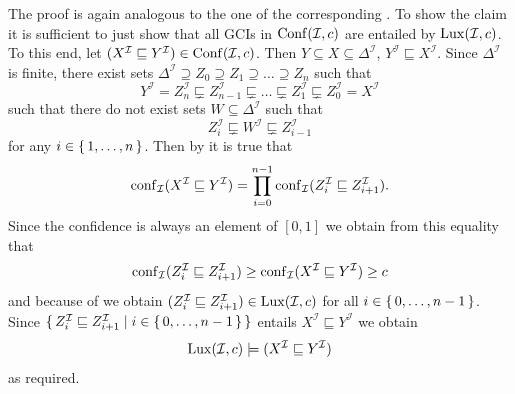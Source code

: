 \begin{Proof}
  The proof is again analogous to the one of the corresponding
  .  To show the claim it is sufficient to just show that all
  GCIs in $\operatorname{Conf}(\mathcal{I}, c)$ are entailed by $\operatorname{Lux}(\mathcal{I}, c)$.  To this end,
  let $(X^{\mathcal{I}} \sqsubseteq Y^{\mathcal{I}}) \in \operatorname{Conf}(\mathcal{I}, c)$.  Then $Y
  \subseteq X \subseteq \Delta^{\mathcal{I}}$, \ie $Y^{\mathcal{I}} \sqsubseteq
  X^{\mathcal{I}}$.  Since $\Delta^{\mathcal{I}}$ is finite, there exist sets
  $\Delta^{\mathcal{I}} \supseteq Z_0 \supseteq Z_1 \supseteq \dots \supseteq Z_n$ such
  that
  \begin{equation*}
    Y^{\mathcal{I}} = Z_n^{\mathcal{I}} \sqsubsetneq Z_{n-1}^{\mathcal{I}} \sqsubsetneq
    \dots \sqsubsetneq Z_1^{\mathcal{I}} \sqsubsetneq Z_0^{\mathcal{I}} = X^{\mathcal{I}}
  \end{equation*}
  such that there do not exist sets $W \subseteq \Delta^{\mathcal{I}}$ such that
  \begin{equation}
    \label{eq:25}
    Z_i^{\mathcal{I}} \sqsubsetneq W^{\mathcal{I}} \sqsubsetneq Z_{i-1}^{\mathcal{I}}
  \end{equation}
  for any $i \in {\ensuremath{\{\, 1, \dots, n \,\}}}$.  Then by
   it is true that
  \begin{equation*}
    \operatorname{conf}_{\mathcal{I}}(X^{\mathcal{I}} \sqsubseteq Y^{\mathcal{I}}) = \prod_{i = 0}^{n-1}
    \operatorname{conf}_{\mathcal{I}}(Z_i^{\mathcal{I}} \sqsubseteq Z_{i+1}^{\mathcal{I}}).
  \end{equation*}
  Since the confidence is always an element of $[0,1]$ we obtain from this equality that
  \begin{equation*}
    \operatorname{conf}_{\mathcal{I}}(Z_i^{\mathcal{I}} \sqsubseteq Z_{i+1}^{\mathcal{I}}) \ge
    \operatorname{conf}_{\mathcal{I}}(X^{\mathcal{I}} \sqsubseteq Y^{\mathcal{I}}) \ge c
  \end{equation*}
  and because of  we obtain $(Z_i^{\mathcal{I}} \sqsubseteq
  Z_{i+1}^{\mathcal{I}}) \in \operatorname{Lux}(\mathcal{I}, c)$ for all $i \in {\ensuremath{\{\, 0, \dots, n-1\,\}}}$.
  Since ${\{\, Z_i^{\mathcal{I}} \sqsubseteq Z_{i+1}^{\mathcal{I}} \mid i \in {\ensuremath{\{\, 0,
      \dots, n-1\,\}}} \,\}}$ entails $X^{\mathcal{I}} \sqsubseteq Y^{\mathcal{I}}$ we obtain
  \begin{equation*}
    \operatorname{Lux}(\mathcal{I}, c) \models (X^{\mathcal{I}} \sqsubseteq Y^{\mathcal{I}})
  \end{equation*}
  as required.
\end{Proof}


